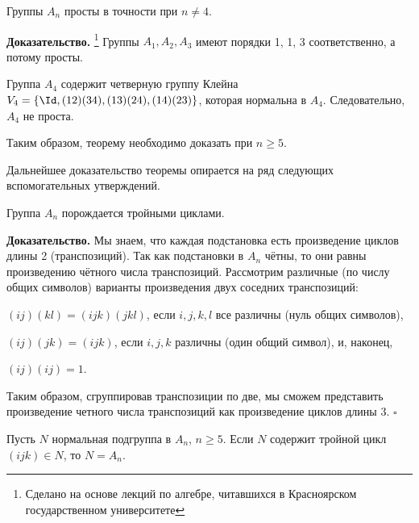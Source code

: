 
\begin{theorem}\label{Tm_An_simple}
	Группы \(A_{n}\) просты в точности при \(n \neq 4\).
\end{theorem}
\textbf{Доказательство.}
\footnote{Сделано на основе лекций по алгебре, читавшихся в Красноярском государственном университете}
Группы $A_1, A_2, A_3$ имеют порядки 1, 1, 3 соответственно, а потому просты. 
\medskip


Группа \(A_{4}\) содержит четверную группу Клейна \(V_{4}=\{\Id , (12)(34), (13)(24), (14)(23) \}\), которая нормальна в $A_4$. Следовательно, $A_4$ не проста.
\medskip

Таким образом, теорему необходимо доказать при $n\geqslant5$.
\medskip

Дальнейшее доказательство теоремы опирается на ряд следующих вспомогательных утверждений.

\begin{theorem}\label{Tm_An_Generation}
	Группа \(A_n\) порождается тройными циклами.
\end{theorem}

\textbf{Доказательство.}
%
Мы знаем, что каждая подстановка есть произведение циклов длины 2
(транспозиций). Так как подстановки в \(A_{n}\) чётны, то они равны
произведению чётного числа транспозиций. Рассмотрим различные (по числу общих символов) варианты произведения двух
соседних транспозиций:

\( (ij)(kl) = (ijk)(jkl)\),
если \(i,j,k,l\) все различны (нуль общих символов),

\(\left( ij \right)\left( jk \right) = \left( {{ijk}} \right)\),
если \(i,j,k\) различны (один общий символ), и, наконец,

\(\left( {{ij}} \right)\left( {{ij}} \right) = 1\).
\medskip

Таким образом, сгруппировав транспозиции по две, мы сможем представить произведение четного числа транспозиций как произведение циклов
длины 3. $\square$

\begin{lemma}\label{Lm_If_triple}
	Пусть $N$ нормальная подгруппа в \(A_{n}\), $n\geqslant 5$. Если \(N\) содержит тройной цикл \( (ijk) \in N\), то \(N = A_{n}\).
\end{lemma}

